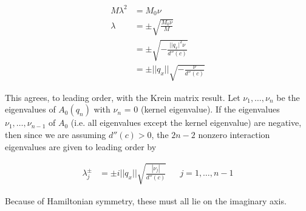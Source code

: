\documentclass[12pt]{article}
\begin{document}
\begin{align*}
M \lambda^2 &= M_0 \nu \\
\lambda &= \pm \sqrt{ \frac{M_0 \nu}{M} } \\
&= \pm \sqrt{ -\frac{||q_x|^2 \nu}{d''(c)} } \\
&= \pm ||q_x|| \sqrt{ -\frac{\nu}{d''(c)} } 
\end{align*}

This agrees, to leading order, with the Krein matrix result. Let $\nu_1,\dots,\nu_n$ be the eigenvalues of $A_0(q_n)$ with $\nu_n$ = 0 (kernel eigenvalue). If the eigenvalues $\nu_1, \dots, \nu_{n-1}$ of $A_0$ (i.e. all eigenvalues except the kernel eigenvalue) are negative, then since we are assuming $d''(c) > 0$, the $2n - 2$ nonzero interaction eigenvalues are given to leading order by 

\begin{align*}
\lambda_j^\pm &= \pm i ||q_x|| \sqrt{ \frac{|\nu_j|}{d''(c)} } && j = 1, \dots, n-1
\end{align*}

Because of Hamiltonian symmetry, these must all lie on the imaginary axis.



\end{document}
